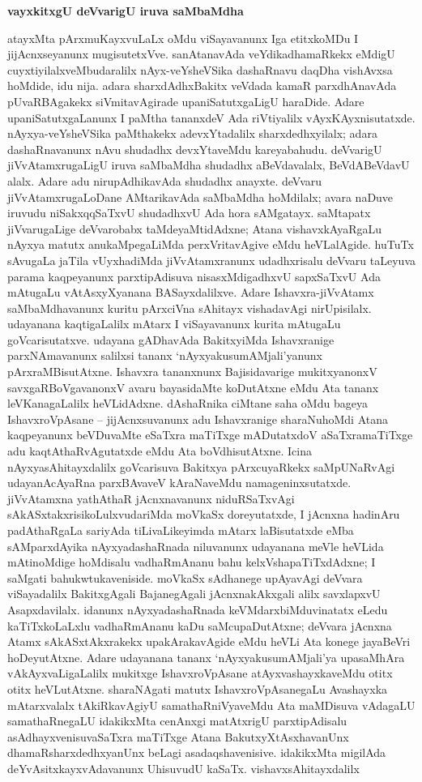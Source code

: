 \bigskip
\begin{center}
{\Large\bf vayxkitxgU deVvarigU iruva saMbaMdha}
\end{center}

atayxMta pArxmuKayxvuLaLx oMdu viSayavanunx Iga etitxkoMDu I jijAcnxseyanunx mugisutetxVve. sanAtanavAda veYdikadhamaRkekx eMdigU cuyxtiyilalxveMbudaralilx nAyx-veYsheVSika dashaRnavu daqDha vishAvxsa hoMdide, idu nija. adara sharxdAdhxBakitx veVdada kamaR parxdhAnavAda pUvaRBAgakekx siVmitavAgirade upaniSatutxgaLigU haraDide. Adare upaniSatutxgaLanunx I paMtha tananxdeV Ada riVtiyalilx vAyxKAyxnisutatxde. nAyxya-veYsheVSika paMthakekx adevxYtadalilx sharxdedhxyilalx; adara dashaRnavanunx nAvu shudadhx devxYtaveMdu kareyabahudu. deVvarigU jiVvAtamxrugaLigU iruva saMbaMdha shudadhx aBeVdavalalx, BeVdABeVdavU alalx. Adare adu nirupAdhikavAda shudadhx anayxte. deVvaru jiVvAtamxrugaLoDane AMtarikavAda saMbaMdha hoMdilalx; avara naDuve iruvudu niSakxqqSaTxvU shudadhxvU Ada hora sAMgatayx. saMtapatx jiVvarugaLige deVvarobabx taMdeyaMtidAdxne; Atana vishavxkAyaRgaLu nAyxya matutx anukaMpegaLiMda perxVritavAgive eMdu heVLalAgide. huTuTx sAvugaLa jaTila vUyxhadiMda jiVvAtamxranunx udadhxrisalu deVvaru taLeyuva parama kaqpeyanunx parxtipAdisuva nisasxMdigadhxvU sapxSaTxvU Ada mAtugaLu vAtAsxyXyanana BASayxdalilxve. Adare Ishavxra-jiVvAtamx saMbaMdhavanunx kuritu pArxciVna sAhitayx vishadavAgi nirUpisilalx. udayanana kaqtigaLalilx mAtarx I viSayavanunx kurita mAtugaLu goVcarisutatxve. udayana gADhavAda BakitxyiMda Ishavxranige parxNAmavanunx salilxsi tananx `nAyxyakusumAMjali'yanunx pArxraMBisutAtxne. Ishavxra tananxnunx Bajisidavarige mukitxyanonxV savxgaRBoVgavanonxV avaru bayasidaMte koDutAtxne eMdu Ata tananx leVKanagaLalilx heVLidAdxne. dAshaRnika ciMtane saha oMdu bageya IshavxroVpAsane -- jijAcnxsuvanunx adu Ishavxranige sharaNuhoMdi Atana kaqpeyanunx beVDuvaMte eSaTxra maTiTxge mADutatxdoV aSaTxramaTiTxge adu kaqtAthaRvAgutatxde eMdu Ata boVdhisutAtxne. Icina nAyxyasAhitayxdalilx goVcarisuva Bakitxya pArxcuyaRkekx saMpUNaRvAgi udayanAcAyaRna parxBAvaveV kAraNaveMdu namageninxsutatxde. jiVvAtamxna yathAthaR jAcnxnavanunx niduRSaTxvAgi sAkASxtakxrisikoLulxvudariMda moVkaSx doreyutatxde, I jAcnxna hadinAru padAthaRgaLa sariyAda tiLivaLikeyimda mAtarx laBisutatxde eMba sAMparxdAyika nAyxyadashaRnada niluvanunx udayanana meVle heVLida mAtinoMdige hoMdisalu vadhaRmAnanu bahu kelxVshapaTiTxdAdxne; I saMgati bahukwtukaveniside. moVkaSx sAdhanege upAyavAgi deVvara viSayadalilx BakitxgAgali BajanegAgali jAcnxnakAkxgali alilx savxlapxvU Asapxdavilalx. idanunx nAyxyadashaRnada keVMdarxbiMduvinatatx eLedu kaTiTxkoLaLxlu vadhaRmAnanu kaDu saMcupaDutAtxne; deVvara jAcnxna Atamx sAkASxtAkxrakekx upakArakavAgide eMdu heVLi Ata konege jayaBeVri hoDeyutAtxne. Adare udayanana tananx `nAyxyakusumAMjali'ya upasaMhAra vAkAyxvaLigaLalilx mukitxge IshavxroVpAsane atAyxvashayxkaveMdu otitx otitx heVLutAtxne. sharaNAgati matutx IshavxroVpAsanegaLu Avashayxka mAtarxvalalx tAkiRkavAgiyU samathaRniVyaveMdu Ata maMDisuva vAdagaLU samathaRnegaLU idakikxMta cenAnxgi matAtxrigU parxtipAdisalu asAdhayxvenisuvaSaTxra maTiTxge Atana BakutxyXtAsxhavanUnx dhamaRsharxdedhxyanUnx beLagi asadaqshavenisive. idakikxMta migilAda deYvAsitxkayxvAdavanunx UhisuvudU kaSaTx. vishavxsAhitayxdalilx 